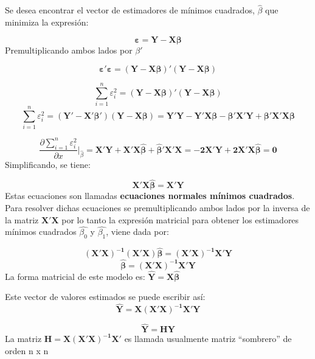 \documentclass[
]{book}
\begin{document}
Se desea encontrar el vector de estimadores de mínimos cuadrados, \(\hat{\beta}\) que minimiza la expresión:

\[
\begin{equation}
\boldsymbol{\varepsilon=Y-X\beta}
\label{eq:relacion-errores-y-x-beta}
\end{equation}
\] Premultiplicando ambos lados por \(\beta'\)

\[
\begin{equation}
\boldsymbol{\varepsilon'\varepsilon=(Y-X\beta)'(Y-X\beta)}
\end{equation}
\]

\[
\sum_{i=1}^n\varepsilon_{i}^2=\boldsymbol{(Y-X\beta)'(Y-X\beta)}
\] \[
\sum_{i=1}^n\varepsilon_{i}^2=\boldsymbol{(Y'-X'\beta')(Y-X\beta)=Y'Y-Y'X\beta-\beta'X'Y+\beta'X'X\beta}
\]

\[
\begin{equation}
\frac{
\partial \sum_{i=1}^n\varepsilon_{i}^2}{\partial x} \Bigg|_{\hat{\beta}}= \boldsymbol{X'Y+X'X\hat{\beta}+\hat{\beta}'X'X=-2X'Y+2X'X\hat{\beta}=0}
\end{equation} 
\] Simplificando, se tiene:

\[
\begin{equation}
\boldsymbol{X'X\hat{\beta}=X'Y}
\end{equation}
\] Estas ecuaciones son llamadas \textbf{ecuaciones normales mínimos cuadrados}. Para resolver dichas ecuaciones se premultiplicando ambos lados por la inversa de la matriz \(\boldsymbol{X'X}\) por lo tanto la expresión matricial para obtener los estimadores mínimos cuadrados \(\hat{\beta_{0}}\) y \(\hat{\beta_{1}}\), viene dada por:

\[
\begin{equation}
\boldsymbol{(X'X)^{-1}(X'X)\hat{\beta}=(X'X)^{-1}X'Y}
\end{equation}
\] \[
\begin{equation}
\boldsymbol{\hat{\beta}=(X'X)^{-1}X'Y}
\end{equation}
\] La forma matricial de este modelo es: \(\boldsymbol{\hat{Y}=X\hat{\beta}}\)

Este vector de valores estimados se puede escribir así: \[
\begin{equation}
\boldsymbol{\hat{Y}=X(X'X)^{-1}X'Y}
\end{equation}
\]

\[
\begin{equation}
\boldsymbol{\hat{Y}=HY}
\label{eq:predicciones-matriz-proyeccion}
\end{equation}
\] La matriz \(\boldsymbol{H=X(X'X)^{-1}X'}\) es llamada usualmente matriz ``sombrero'' de orden n x n
\end{document}
